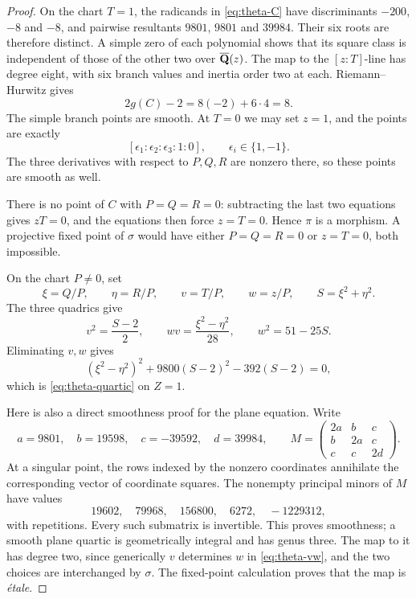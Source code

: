 \begin{proof}
On the chart $T=1$, the radicands in \eqref{eq:theta-C} have
discriminants $-200$, $-8$ and $-8$, and pairwise resultants
$9801$, $9801$ and $39984$. Their six roots are therefore distinct.  A simple zero
of each polynomial shows that its square class is independent of those of
the other two over $\overline{\mathbf Q}(z)$.  The map to the $[z:T]$-line has
degree eight, with six branch values and inertia order two at each.
Riemann--Hurwitz gives
\[
 2g(C)-2=8(-2)+6\cdot4=8.
\]
The simple branch points are smooth.  At $T=0$ we may set $z=1$, and the
points are exactly
\[
 [\epsilon_1:\epsilon_2:\epsilon_3:1:0],\qquad
 \epsilon_i\in\{1,-1\}.
\]
The three derivatives with respect to $P,Q,R$ are nonzero there, so these
points are smooth as well.

There is no point of $C$ with $P=Q=R=0$: subtracting the last two equations
gives $zT=0$, and the equations then force $z=T=0$.  Hence $\pi$ is a
morphism.  A projective fixed point of $\sigma$ would have either
$P=Q=R=0$ or $z=T=0$, both impossible.

On the chart $P\ne0$, set
\[
 \xi=Q/P,\qquad \eta=R/P,\qquad v=T/P,\qquad w=z/P,
 \qquad S=\xi^2+\eta^2.
\]
The three quadrics give
\begin{equation}
 v^2=\frac{S-2}{2},\qquad
 wv=\frac{\xi^2-\eta^2}{28},\qquad
 w^2=51-25S.
 \label{eq:theta-vw}
\end{equation}
Eliminating $v,w$ gives
\begin{equation}
 (\xi^2-\eta^2)^2+9800(S-2)^2-392(S-2)=0,
 \label{eq:theta-elimination}
\end{equation}
which is \eqref{eq:theta-quartic} on $Z=1$.

Here is also a direct smoothness proof for the plane equation.  Write
\[
 a=9801,\quad b=19598,\quad c=-39592,\quad d=39984,
 \qquad
 M=\begin{pmatrix}2a&b&c\\b&2a&c\\c&c&2d\end{pmatrix}.
\]
At a singular point, the rows indexed by the nonzero coordinates
annihilate the corresponding vector of coordinate squares.  The nonempty
principal minors of $M$ have values
\[
 19602,\quad79968,\quad156800,\quad6272,\quad-1229312,
\]
with repetitions.  Every such submatrix is invertible.  This proves
smoothness; a smooth plane quartic is geometrically integral and has
genus three.  The map to it has degree two, since generically $v$ determines
$w$ in \eqref{eq:theta-vw}, and the two choices are interchanged by $\sigma$.
The fixed-point calculation proves that the map is \emph{\'etale}.
\end{proof}

